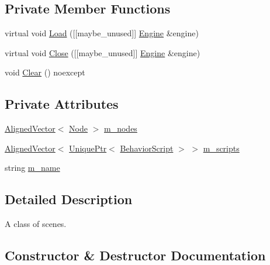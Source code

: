 \subsection*{Private Member Functions}
\begin{DoxyCompactItemize}
\item 
virtual void \mbox{\hyperlink{classmage_1_1_scene_a02ec2f7b43fd7050bc41eb7d89d4baba}{Load}} (\mbox{[}\mbox{[}maybe\+\_\+unused\mbox{]}\mbox{]} \mbox{\hyperlink{classmage_1_1_engine}{Engine}} \&engine)
\item 
virtual void \mbox{\hyperlink{classmage_1_1_scene_a6b90bb51fb3b5e965a42bfa57f992803}{Close}} (\mbox{[}\mbox{[}maybe\+\_\+unused\mbox{]}\mbox{]} \mbox{\hyperlink{classmage_1_1_engine}{Engine}} \&engine)
\item 
void \mbox{\hyperlink{classmage_1_1_scene_adf4a5b3885e34336caa5f145f55e01e1}{Clear}} () noexcept
\end{DoxyCompactItemize}
\subsection*{Private Attributes}
\begin{DoxyCompactItemize}
\item 
\mbox{\hyperlink{namespacemage_a8664bfb5ce2179fc64eae9f82c8a5ba8}{Aligned\+Vector}}$<$ \mbox{\hyperlink{classmage_1_1_node}{Node}} $>$ \mbox{\hyperlink{classmage_1_1_scene_a270ac4a26210b95ba05957af19c4c43c}{m\+\_\+nodes}}
\item 
\mbox{\hyperlink{namespacemage_a8664bfb5ce2179fc64eae9f82c8a5ba8}{Aligned\+Vector}}$<$ \mbox{\hyperlink{namespacemage_a3316d7143a973e37adf1110f2e80ca31}{Unique\+Ptr}}$<$ \mbox{\hyperlink{classmage_1_1_behavior_script}{Behavior\+Script}} $>$ $>$ \mbox{\hyperlink{classmage_1_1_scene_ae57ca3aeb6b0d8b2cb8cf40334b883f8}{m\+\_\+scripts}}
\item 
string \mbox{\hyperlink{classmage_1_1_scene_a6cc8cb08b1853c4e3063b33a94e8fb47}{m\+\_\+name}}
\end{DoxyCompactItemize}


\subsection{Detailed Description}
A class of scenes. 

\subsection{Constructor \& Destructor Documentation}
\mbox{\label{classmage_1_1_scene_adc40910fdca62586659c2961fe7e7f3c}} 
